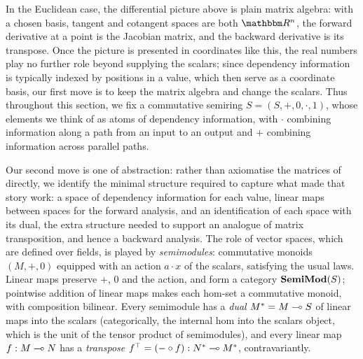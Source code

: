 In the Euclidean case, the differential picture above is plain matrix algebra: with a chosen basis, tangent
and cotangent spaces are both $\RR^n$, the forward derivative at a point is the Jacobian matrix, and the
backward derivative is its transpose. Once the picture is presented in coordinates like this, the real numbers
play no further role beyond supplying the scalars; since dependency information is typically indexed by
positions in a value, which then serve as a coordinate basis, our first move is to keep the matrix algebra and
change the scalars. Thus throughout this section, we fix a commutative semiring $S = (S, +, 0, \cdot, 1)$,
whose elements we think of as atoms of dependency information, with $\cdot$ combining information along a path
from an input to an output and $+$ combining information across parallel paths.

Our second move is one of abstraction: rather than axiomatise the matrices of  directly,
we identify the minimal structure required to capture what made that story work: a space of dependency
information for each value, linear maps between spaces for the forward analysis, and an identification of each
space with its dual, the extra structure needed to support an analogue of matrix transposition, and hence a
backward analysis. The role of vector spaces, which are defined over fields, is played by \emph{semimodules}:
commutative monoids $(M, +, 0)$ equipped with an action $a \cdot x$ of the scalars, satisfying the usual laws.
Linear maps preserve $+$, $0$ and the action, and form a category $\mathbf{SemiMod}(S)$; pointwise addition of linear
maps makes each hom-set a commutative monoid, with composition bilinear. Every semimodule has a \emph{dual}
$M^* = M \multimap S$ of linear maps into the scalars (categorically, the internal hom into the scalars
object, which is the unit of the tensor product of semimodules), and every linear map $f : M \multimap N$ has
a \emph{transpose} $f^{\top} = (- \circ f) : N^* \multimap M^*$, contravariantly.

